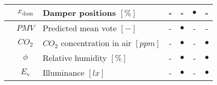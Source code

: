 \documentclass[10pt]{extarticle}
\begin{document}
\begin{table}[h]
\begin{adjustwidth}{-1cm}{}
\begin{tabular}{l|c|l|cccc}
		& $x_{\text{dam}}$ & Damper positions $[\%]$ & - & - & $\bullet$ & - \\
		\midrule
		 &
		$PMV$ & Predicted mean vote $[-]$ & - & $\bullet$ & - & - \\
		& $CO_2$ & $CO_2$ concentration in air $[ppm]$ & - & $\bullet$ & - & $\bullet$ \\
		& $\phi$ & Relative humidity  $[\%]$ & - & $\bullet$ & - & $\bullet$ \\
		& $E_{\text{v}}$ & Illuminance $[lx]$ & - & $\bullet$ & - & $\bullet$ \\
		\bottomrule 
	\end{tabular}
	 \end{adjustwidth}
\end{table} 
\end{document}

